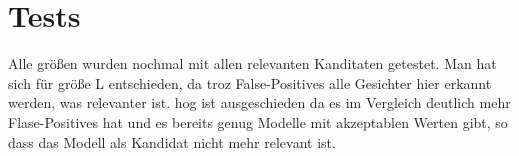 \chapter{Tests}

Alle größen wurden nochmal mit allen relevanten Kanditaten getestet. Man hat sich für größe L entschieden, da troz False-Positives alle Gesichter hier erkannt werden, was relevanter ist. \gls{hog} ist ausgeschieden da es im Vergleich deutlich mehr Flase-Positives hat und es bereits genug Modelle mit akzeptablen Werten gibt, so dass das Modell als Kandidat nicht mehr relevant ist.
